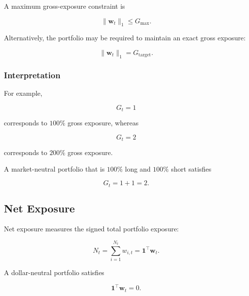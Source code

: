 \documentclass[11pt,a4paper]{article}
\begin{document}
A maximum gross-exposure constraint is

\begin{equation}
\boxed{
\|\mathbf{w}_t\|_1
\leq
G_{\max}.
}
\end{equation}

Alternatively, the portfolio may be required to maintain an exact gross
exposure:

\begin{equation}
\boxed{
\|\mathbf{w}_t\|_1
=
G_{\mathrm{target}}.
}
\end{equation}


\subsubsection{Interpretation}

For example,

\begin{equation}
G_t=1
\end{equation}

corresponds to $100\%$ gross exposure, whereas

\begin{equation}
G_t=2
\end{equation}

corresponds to $200\%$ gross exposure.

A market-neutral portfolio that is $100\%$ long and $100\%$ short satisfies

\begin{equation}
G_t
=
1+1
=
2.
\end{equation}


\subsection{Net Exposure}
\label{subsec:net_exposure}

Net exposure measures the signed total portfolio exposure:

\begin{equation}
\boxed{
N_t
=
\sum_{i=1}^{N_t}
w_{i,t}
=
\mathbf{1}^{\top}\mathbf{w}_t.
}
\end{equation}

A dollar-neutral portfolio satisfies

\begin{equation}
\boxed{
\mathbf{1}^{\top}\mathbf{w}_t
=
0.
}
\end{equation}
\end{document}
